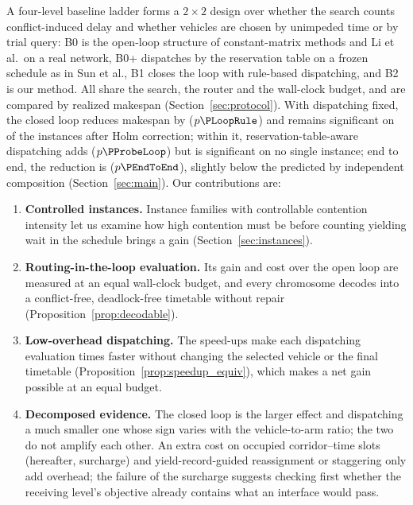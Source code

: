 A four-level baseline ladder forms a $2\times2$ design over whether the search counts conflict-induced delay and whether vehicles are chosen by unimpeded time or by trial query: B0 is the open-loop structure of constant-matrix methods and Li et al.\ on a real network, B0+ dispatches by the reservation table on a frozen schedule as in Sun et al., B1 closes the loop with rule-based dispatching, and B2 is our method.
All share the search, the router and the wall-clock budget, and are compared by realized makespan (Section~\ref{sec:protocol}).
With dispatching fixed, the closed loop reduces makespan by \GainLoopRule{} ($p\PLoopRule$) and remains significant on \CellsSigLoopAdj{} of the \NCases{} instances after Holm correction; within it, reservation-table-aware dispatching adds \GainProbeLoop{} ($p\PProbeLoop$) but is significant on no single instance; end to end, the reduction is \GainEndToEnd{} ($p\PEndToEnd$), slightly below the \GainIndepProduct{} predicted by independent composition (Section~\ref{sec:main}).
Our contributions are:

\begin{enumerate}[leftmargin=*]
\item \textbf{Controlled instances.} Instance families with controllable contention intensity let us examine how high contention must be before counting yielding wait in the schedule brings a gain (Section~\ref{sec:instances}).
\item \textbf{Routing-in-the-loop evaluation.} Its gain and cost over the open loop are measured at an equal wall-clock budget, and every chromosome decodes into a conflict-free, deadlock-free timetable without repair (Proposition~\ref{prop:decodable}).
\item \textbf{Low-overhead dispatching.} The speed-ups make each dispatching evaluation \SpeedupProbe{} times faster without changing the selected vehicle or the final timetable (Proposition~\ref{prop:speedup_equiv}), which makes a net gain possible at an equal budget.
\item \textbf{Decomposed evidence.} The closed loop is the larger effect and dispatching a much smaller one whose sign varies with the vehicle-to-arm ratio; the two do not amplify each other. An extra cost on occupied corridor--time slots (hereafter, surcharge) and yield-record-guided reassignment or staggering only add overhead; the failure of the surcharge suggests checking first whether the receiving level's objective already contains what an interface would pass.
\end{enumerate}

